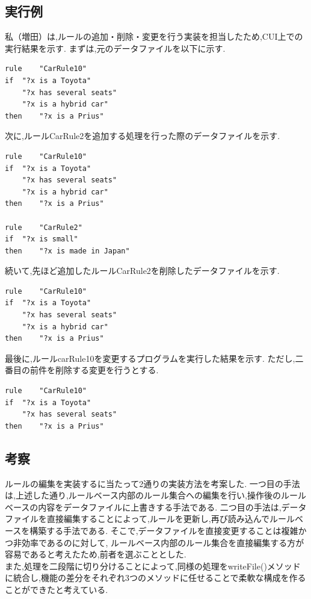 \documentclass[uplatex,12pt]{jsarticle}
\begin{document}
\subsection{実行例}
私（増田）は,ルールの追加・削除・変更を行う実装を担当したため,CUI上での実行結果を示す.
まずは,元のデータファイルを以下に示す.
\begin{lstlisting}[caption=初期のEditRuleTest.data, label=mid]
rule 	"CarRule10"
if 	"?x is a Toyota"
    "?x has several seats"
    "?x is a hybrid car"
then	"?x is a Prius"
\end{lstlisting}
次に,ルールCarRule2を追加する処理を行った際のデータファイルを示す.
\begin{lstlisting}[caption=ルール追加後のEditRuleTest.data, label=mid]
rule	"CarRule10"
if	"?x is a Toyota"
	"?x has several seats"
	"?x is a hybrid car"
then	"?x is a Prius"

rule	"CarRule2"
if	"?x is small"
then	"?x is made in Japan"
\end{lstlisting}
続いて,先ほど追加したルールCarRule2を削除したデータファイルを示す.
\begin{lstlisting}[caption=ルール削除後のEditRuleTest.data, label=mid]
rule	"CarRule10"
if	"?x is a Toyota"
    "?x has several seats"
    "?x is a hybrid car"
then	"?x is a Prius"
\end{lstlisting}
最後に,ルールcarRule10を変更するプログラムを実行した結果を示す.
ただし,二番目の前件を削除する変更を行うとする.
\begin{lstlisting}[caption=ルール変更後のEditRuleTest.data, label=mid]
rule	"CarRule10"
if	"?x is a Toyota"
	"?x has several seats"
then	"?x is a Prius"
\end{lstlisting}

\subsection{考察}
ルールの編集を実装するに当たって2通りの実装方法を考案した.
一つ目の手法は,上述した通り,ルールベース内部のルール集合への編集を行い,操作後のルールベースの内容をデータファイルに上書きする手法である.
二つ目の手法は,データファイルを直接編集することによって,ルールを更新し,再び読み込んでルールベースを構築する手法である.
そこで,データファイルを直接変更することは複雑かつ非効率であるのに対して,
ルールベース内部のルール集合を直接編集する方が容易であると考えたため,前者を選ぶこととした. \\
また,処理を二段階に切り分けることによって,同様の処理をwriteFile()メソッドに統合し,機能の差分をそれぞれ3つのメソッドに任せることで柔軟な構成を作ることができたと考えている.
\end{document}
